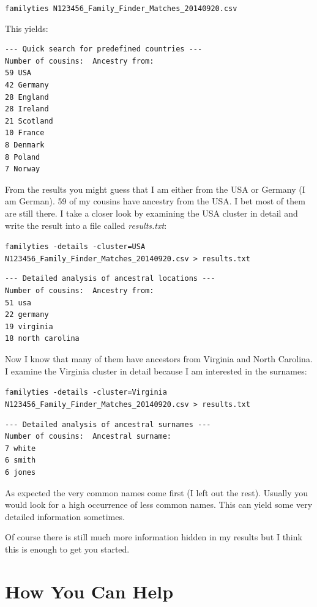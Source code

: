 \documentclass[12pt,a4paper]{article}
\begin{document}
\vspace{1em}
\noindent\texttt{familyties N123456\_Family\_Finder\_Matches\_20140920.csv}

\vspace{1em}
\noindent This yields:

\begin{verbatim}
--- Quick search for predefined countries ---
Number of cousins:  Ancestry from:
59 USA
42 Germany
28 England
28 Ireland
21 Scotland
10 France
8 Denmark
8 Poland
7 Norway
\end{verbatim}

From the results you might guess that I am either from the
USA or Germany (I am German). 59 of my cousins have ancestry
from the USA. I bet most of them are still there. I take a
closer look by examining the USA cluster in detail and write
the result into a file called \emph{results.txt}:

\vspace{1em}
\noindent\texttt{familyties -details -cluster=USA \\
N123456\_Family\_Finder\_Matches\_20140920.csv > results.txt}

\begin{verbatim}
--- Detailed analysis of ancestral locations ---
Number of cousins:  Ancestry from:
51 usa
22 germany
19 virginia
18 north carolina
\end{verbatim}

Now I know that many of them have ancestors from Virginia
and North Carolina. I examine the Virginia cluster in detail
because I am interested in the surnames:

\vspace{1em}
\noindent\texttt{familyties -details -cluster=Virginia \\
N123456\_Family\_Finder\_Matches\_20140920.csv > results.txt}

\begin{verbatim}
--- Detailed analysis of ancestral surnames ---
Number of cousins:  Ancestral surname:
7 white
6 smith
6 jones
\end{verbatim}

As expected the very common names come first (I left out
the rest). Usually you would look for a high occurrence
of less common names. This can yield some very detailed
information sometimes. 

Of course there is still much more information hidden in 
my results but I think this is enough to get you started.


\section{How You Can Help}
\end{document}
